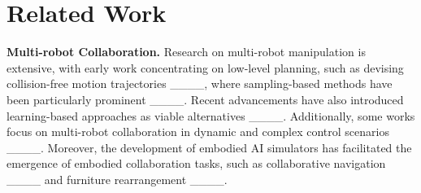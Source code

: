 \section{Related Work}
\label{sec:related}

\noindent \textbf{Multi-robot Collaboration.}
Research on multi-robot manipulation is extensive, with early work concentrating on low-level planning, such as devising collision-free motion trajectories ____, where sampling-based methods have been particularly prominent ____. Recent advancements have also introduced learning-based approaches as viable alternatives ____. Additionally, some works focus on multi-robot collaboration in dynamic and complex control scenarios ____. Moreover, the development of embodied AI simulators has facilitated the emergence of embodied collaboration tasks, such as collaborative navigation ____ and furniture rearrangement ____. 

